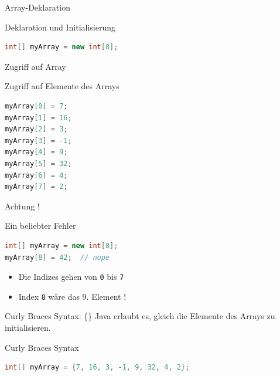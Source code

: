 \documentclass[18pt]{beamer}
\begin{document}
\begin{frame}[fragile]{Array-Deklaration}
    \begin{exampleblock}{Deklaration und Initialisierung}
        \begin{lstlisting}[language=Java]
int[] myArray = new int[8];
        \end{lstlisting}
    \end{exampleblock}

\end{frame}

\begin{frame}[fragile]{Zugriff auf Array}
    \begin{exampleblock}{Zugriff auf Elemente des Arrays}
        \begin{lstlisting}[language=Java]
myArray[0] = 7;
myArray[1] = 16;
myArray[2] = 3;
myArray[3] = -1;
myArray[4] = 9;
myArray[5] = 32;
myArray[6] = 4;
myArray[7] = 2;
        \end{lstlisting}
    \end{exampleblock}

\end{frame}

\begin{frame}[fragile]{Achtung !}
    \begin{alertblock}{Ein beliebter Fehler}
        \begin{lstlisting}[language=Java]
int[] myArray = new int[8];
myArray[8] = 42;  // nope
        \end{lstlisting}

    \end{alertblock}

    \pause

    \begin{itemize}
        \item Die Indizes gehen von \texttt{0} bis \texttt{7}
        \item Index \texttt{8} wäre das 9. Element !
    \end{itemize}

\end{frame}

\begin{frame}[fragile]{Curly Braces Syntax: \{\}}
    Java erlaubt es, gleich die Elemente des Arrays zu initialisieren.
    \begin{exampleblock}{Curly Braces Syntax}
        \begin{lstlisting}[language=Java]
int[] myArray = {7, 16, 3, -1, 9, 32, 4, 2};
        \end{lstlisting}

    \end{exampleblock}

\end{frame}
\end{document}

